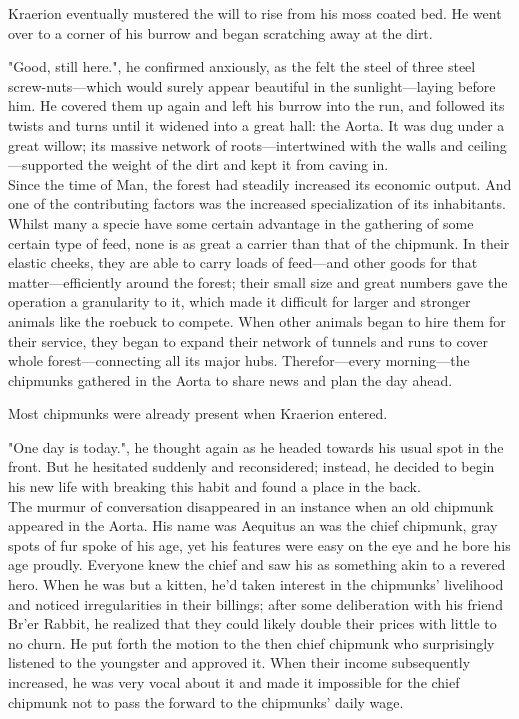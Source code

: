 Kraerion eventually mustered the will to rise from his moss coated bed. He went over to a corner of his burrow and began scratching away at the dirt.

"Good, still here.", he confirmed anxiously, as the felt the steel of three steel screw-nuts---which would surely appear beautiful in the sunlight---laying before him. He covered them up again and left his burrow into the run, and followed its twists and turns until it widened into a great hall: the Aorta. It was dug under a great willow; its massive network of roots---intertwined with the walls and ceiling---supported the weight of the dirt and kept it from caving in.\\

Since the time of Man, the forest had steadily increased its economic output. And one of the  contributing factors was the increased specialization of its inhabitants. Whilst many a specie have some certain advantage in the gathering of some certain type of feed, none is as great a carrier than that of the chipmunk. In their elastic cheeks, they are able to carry loads of feed---and other goods for that matter---efficiently around the forest; their small size and great numbers gave the operation a granularity to it, which made it difficult for larger and stronger animals like the roebuck to compete. When other animals began to hire them for their service, they began to expand their network of tunnels and runs to cover whole forest---connecting all its major hubs. Therefor---every morning---the chipmunks gathered in the Aorta to share news and plan the day ahead.

Most chipmunks were already present when Kraerion entered. 

"One day is today.", he thought again as he  headed towards his usual spot in the front. But he hesitated suddenly and reconsidered; instead, he decided to begin his new life with breaking this habit and found a place in the back.\\

The murmur of conversation disappeared in an instance when an old chipmunk appeared in the Aorta. His name was Aequitus an was the chief chipmunk, gray spots of fur spoke of his age, yet his features were easy on the eye and he bore his age proudly. Everyone knew the chief and saw his as something akin to a revered hero. When he was but a kitten, he'd taken interest in the chipmunks' livelihood and noticed irregularities in their billings; after some deliberation with his friend Br'er Rabbit, he realized that they could likely double their prices with little to no churn. He put forth the motion to the then chief chipmunk who surprisingly listened to the youngster and approved it. When their income subsequently increased, he was very vocal about it and made it impossible for the chief chipmunk not to pass the forward to the chipmunks' daily wage.

